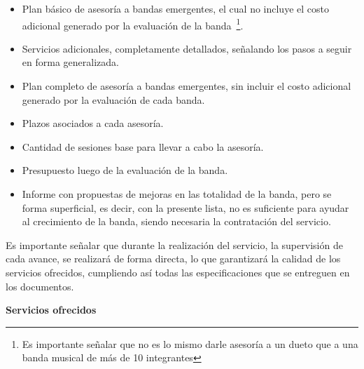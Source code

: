 \begin{itemize}
	\item Plan básico de asesoría a bandas emergentes, el cual no incluye el costo adicional
		generado por la evaluación de la banda~\footnote{Es importante señalar que no es lo mismo
		darle asesoría a un dueto que a una banda musical de más de 10 integrantes}.
	\item Servicios adicionales, completamente detallados, señalando los pasos a seguir
		en forma generalizada.
	\item Plan completo de asesoría a bandas emergentes, sin incluir el costo adicional generado
		por la evaluación de cada banda.
	\item Plazos asociados a cada asesoría.
	\item Cantidad de sesiones base para llevar a cabo la asesoría.
	\item Presupuesto luego de la evaluación de la banda.
	\item Informe con propuestas de mejoras en las totalidad de la banda, pero se forma superficial,
		es decir, con la presente lista, no es suficiente para ayudar al crecimiento de la banda,
		siendo necesaria la contratación del servicio.
\end{itemize}

Es importante señalar que durante la realización del servicio,
la supervisión de cada avance, se realizará de forma directa, lo que
garantizará la calidad de los servicios ofrecidos, cumpliendo así
todas las especificaciones que se entreguen en los documentos.

{\bf Servicios ofrecidos}


